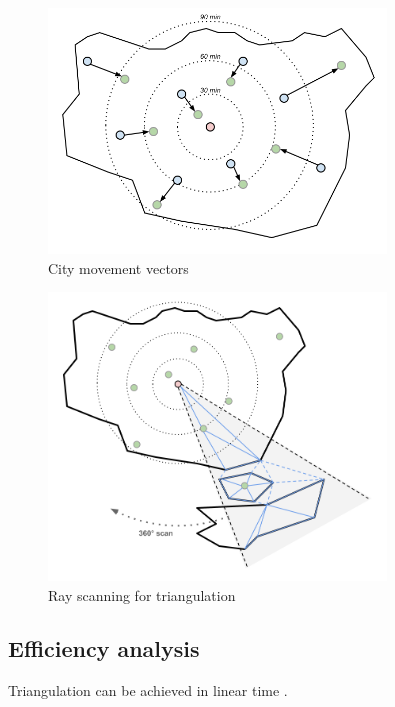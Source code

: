 \documentclass[a4paper,11pt]{article}
\begin{document}
\begin{figure}[h!]
  \centering
  \includegraphics[width=0.8\textwidth]{forces.png}
  \caption{City movement vectors}
  \label{forces}
\end{figure}

\begin{figure}[h!]
  \centering
  \includegraphics[width=0.8\textwidth]{scan.png}
  \caption{Ray scanning for triangulation}
  \label{scan}
\end{figure}

\subsection{Efficiency analysis}
Triangulation can be achieved in linear time \cite{chazelle}.

\nocite{*}


\end{document}
